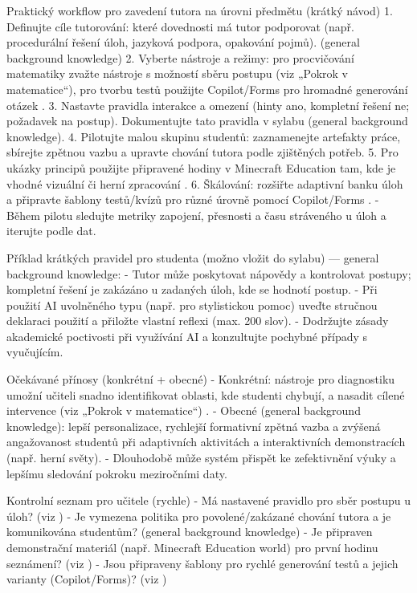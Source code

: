 \documentclass{report}%
\begin{document}
Praktický workflow pro zavedení tutora na úrovni předmětu (krátký návod)
1. Definujte cíle tutorování: které dovednosti má tutor podporovat (např. procedurální řešení úloh, jazyková podpora, opakování pojmů). (general background knowledge)
2. Vyberte nástroje a režimy: pro procvičování matematiky zvažte nástroje s možností sběru postupu (viz „Pokrok v matematice“), pro tvorbu testů použijte Copilot/Forms pro hromadné generování otázek \cite{kb_ai_101_tipu_pdf_04e4a115_page_8_1, kb_ai_101_tipu_pdf_04e4a115_page_36_1}.
3. Nastavte pravidla interakce a omezení (hinty ano, kompletní řešení ne; požadavek na postup). Dokumentujte tato pravidla v sylabu (general background knowledge).
4. Pilotujte malou skupinu studentů: zaznamenejte artefakty práce, sbírejte zpětnou vazbu a upravte chování tutora podle zjištěných potřeb.
5. Pro ukázky principů použijte připravené hodiny v Minecraft Education tam, kde je vhodné vizuální či herní zpracování \cite{kb_ai_101_tipu_pdf_04e4a115_page_15_2}.
6. Škálování: rozšiřte adaptivní banku úloh a připravte šablony testů/kvízů pro různé úrovně pomocí Copilot/Forms \cite{kb_ai_101_tipu_pdf_04e4a115_page_36_1}.
- Během pilotu sledujte metriky zapojení, přesnosti a času stráveného u úloh a iterujte podle dat.

Příklad krátkých pravidel pro studenta (možno vložit do sylabu) — general background knowledge:
- Tutor může poskytovat nápovědy a kontrolovat postupy; kompletní řešení je zakázáno u zadaných úloh, kde se hodnotí postup.
- Při použití AI uvolněného typu (např. pro stylistickou pomoc) uveďte stručnou deklaraci použití a přiložte vlastní reflexi (max. 200 slov).
- Dodržujte zásady akademické poctivosti při využívání AI a konzultujte pochybné případy s vyučujícím.

Očekávané přínosy (konkrétní + obecné)
- Konkrétní: nástroje pro diagnostiku umožní učiteli snadno identifikovat oblasti, kde studenti chybují, a nasadit cílené intervence (viz „Pokrok v matematice“) \cite{kb_ai_101_tipu_pdf_04e4a115_page_8_1}.
- Obecné (general background knowledge): lepší personalizace, rychlejší formativní zpětná vazba a zvýšená angažovanost studentů při adaptivních aktivitách a interaktivních demonstracích (např. herní světy).
- Dlouhodobě může systém přispět ke zefektivnění výuky a lepšímu sledování pokroku meziročními daty.

Kontrolní seznam pro učitele (rychle)
- Má nastavené pravidlo pro sběr postupu u úloh? (viz \cite{kb_ai_101_tipu_pdf_04e4a115_page_8_1})
- Je vymezena politika pro povolené/zakázané chování tutora a je komunikována studentům? (general background knowledge)
- Je připraven demonstrační materiál (např. Minecraft Education world) pro první hodinu seznámení? (viz \cite{kb_ai_101_tipu_pdf_04e4a115_page_15_2})
- Jsou připraveny šablony pro rychlé generování testů a jejich varianty (Copilot/Forms)? (viz \cite{kb_ai_101_tipu_pdf_04e4a115_page_36_1})
\end{document}

